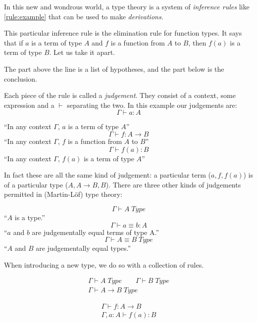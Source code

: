 In this new and wondrous world, a type theory is a system of \emph{inference
  rules} like \ref{rule:example} that can be used to make \emph{derivations}.

This particular inference rule is the elimination rule for function types. It
says that if $a$ is a term of type $A$ and $f$ is a function from $A$ to $B$,
then $f(a)$ is a term of type $B$. Let us take it apart.

The part above the line is a list of hypotheses, and the part below is the conclusion.

Each piece of the rule is called a \emph{judgement}. They consist of a
context, some expression and a $\vdash$ separating the two. In this example our judgements are:
\[\Gamma \vdash a : A\]
\begin{center}
``In any context $\Gamma$, $a$ is a term of type $A$''
\[\Gamma \vdash f : A \rightarrow B\]
``In any context $\Gamma$, $f$ is a function from $A$ to $B$''
\[\Gamma \vdash f(a) : B\]
``In any context $\Gamma$, $f(a)$ is a term of type $A$''
\end{center}

In fact these are all the same kind of judgement: a particular term ($a, f, f(a)$) is of a
particular type ($A, A \rightarrow B, B$). There are three other kinds of
judgements permitted in (Martin-Löf) type theory:
\begin{center}
  \[\Gamma \vdash A \; Type\]
  ``$A$ is a type.''
  \[\Gamma \vdash a \equiv b : A\]
  ``$a$ and $b$ are judgementally equal terms of type A.''
  \[\Gamma \vdash A \equiv B \; Type\]
  ``$A$ and $B$ are judgementally equal types.''
\end{center}


When introducing a new type, we do so with a collection of rules.

\begin{equation}
  \begin{array}{c}
    \Gamma \vdash A \; Type \qquad \Gamma \vdash B \; Type\\
    \hline
    \Gamma \vdash A \rightarrow B \; Type
  \end{array}
  \label{rule:function-intro}
\end{equation}

\begin{equation}
  \begin{array}{c}
    \Gamma \vdash f : A \rightarrow B\\
    \hline
    \Gamma, a : A \vdash f(a) : B
  \end{array}
  \label{rule:function-eval}
\end{equation}

